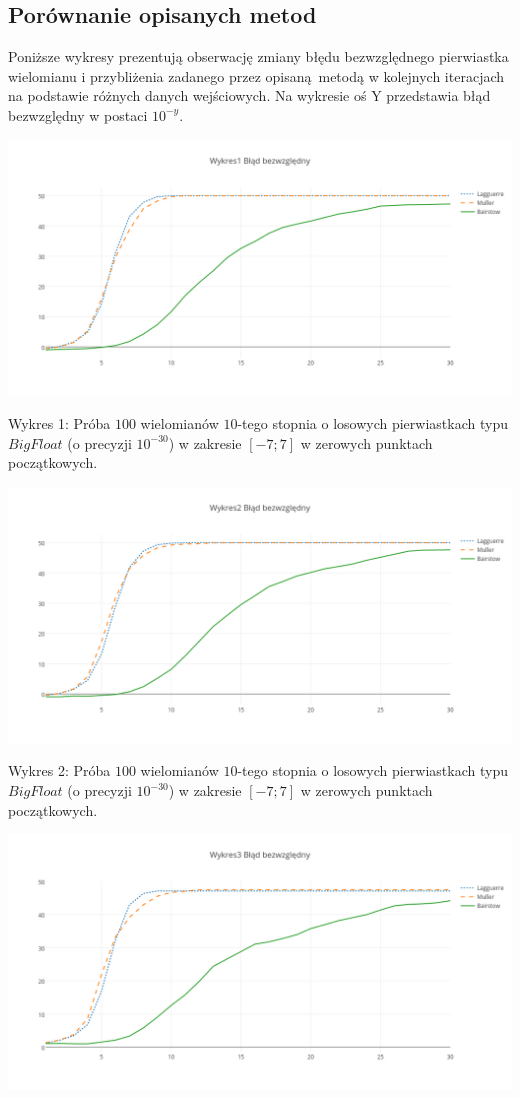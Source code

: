 \documentclass{article}
\begin{document}
\subsection{Porównanie opisanych metod}

Poniższe wykresy prezentują obserwację zmiany błędu bezwzględnego pierwiastka wielomianu i przybliżenia zadanego przez opisaną metodą w kolejnych iteracjach na podstawie różnych danych wejściowych. Na wykresie oś Y przedstawia błąd bezwzględny w postaci $10^{-y}$.

\includegraphics[scale=0.45]{W1.png}

Wykres 1:
Próba $100$ wielomianów $10$-tego stopnia o losowych pierwiastkach typu $BigFloat$ (o precyzji $10^{-30}$) w zakresie $[-7;7]$ w zerowych punktach początkowych.

\includegraphics[scale=0.45]{W2.png}

Wykres 2:
Próba $100$ wielomianów $10$-tego stopnia o losowych pierwiastkach typu $BigFloat$ (o precyzji $10^{-30}$) w zakresie $[-7;7]$ w zerowych punktach początkowych.


\includegraphics[scale=0.45]{W3.png}
\end{document}
